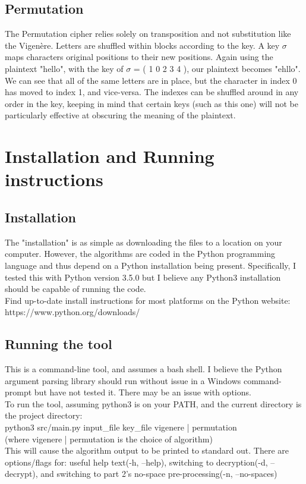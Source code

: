\documentclass[12pt,oneside,a4paper]{article}
\begin{document}
\subsection*{Permutation}
The Permutation cipher relies solely on transposition and not substitution 
like the Vigenère.  Letters are shuffled within blocks according to the key.  
A key $\sigma$ maps characters original positions to their new positions.  
Again using the plaintext "hello", with the key of $\sigma$ = ( 1 0 2 3 4 ), 
our plaintext becomes "ehllo". \\

We can see that all of the same letters are in place, but the character in 
index 0 has moved to index 1, and vice-versa.  The indexes can be shuffled 
around in any order in the key, keeping in mind that certain keys (such as 
this one) will not be particularly effective at obscuring the meaning of the 
plaintext.


\section*{Installation and Running instructions}
\subsection*{Installation}
The "installation" is as simple as downloading the files to a location on your 
computer.  However, the algorithms are coded in the Python programming 
language and thus depend on a Python installation being present.  
Specifically, I tested this with Python version 3.5.0 but I believe any 
Python3 installation should be capable of running the code. \\

Find up-to-date install instructions for most platforms on the Python 
website: {https://www.python.org/downloads/}

\subsection*{Running the tool}
This is a command-line tool, and assumes a bash shell.  I believe the Python 
argument parsing library should run without issue in a Windows command-prompt 
but have not tested it.  There may be an issue with options. \\

To run the tool, assuming python3 is on your PATH, and the current directory 
is the project directory: \\
python3 src/main.py input\_file key\_file {vigenere | permutation} \\
(where {vigenere | permutation} is the choice of algorithm) \\

This will cause the algorithm output to be printed to standard out. There are 
options/flags for:  useful help text(-h, --help), switching to 
decryption(-d, --decrypt), and switching to part 2's no-space 
pre-processing(-n, --no-spaces)
\end{document}
